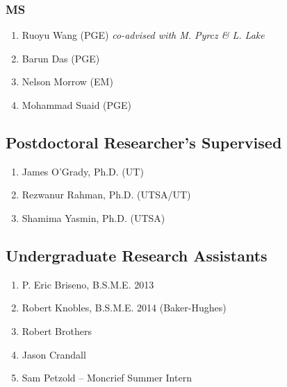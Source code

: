 \subsubsection*{MS}
\begin{enumerate}
    \item Ruoyu Wang (PGE) \emph{co-advised with M. Pyrcz \& L. Lake}
    \item Barun Das (PGE) 
    \item Nelson Morrow (EM) 
    \item Mohammad Suaid (PGE) 
\end{enumerate}

\subsection*{Postdoctoral Researcher's Supervised}
  \begin{enumerate}
      \item James O'Grady, Ph.D. (UT)
      \item Rezwanur Rahman, Ph.D. (UTSA/UT)
      \item Shamima Yasmin, Ph.D. (UTSA)
  \end{enumerate}

\subsection*{Undergraduate Research Assistants}
  \begin{enumerate}
    \item P. Eric Briseno, B.S.M.E. 2013
    \item Robert Knobles, B.S.M.E. 2014 (Baker-Hughes)
    \item Robert Brothers
    \item Jason Crandall
    \item Sam Petzold -- Moncrief Summer Intern
  \end{enumerate}


